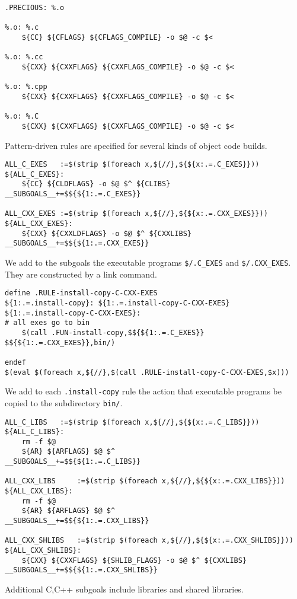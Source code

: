 \documentclass{article}
\begin{document}
\begin{verbatim}
.PRECIOUS: %.o

%.o: %.c
	${CC} ${CFLAGS} ${CFLAGS_COMPILE} -o $@ -c $<

%.o: %.cc
	${CXX} ${CXXFLAGS} ${CXXFLAGS_COMPILE} -o $@ -c $<

%.o: %.cpp
	${CXX} ${CXXFLAGS} ${CXXFLAGS_COMPILE} -o $@ -c $<

%.o: %.C
	${CXX} ${CXXFLAGS} ${CXXFLAGS_COMPILE} -o $@ -c $<
\end{verbatim}
Pattern-driven rules are specified for several kinds of
object code builds.

\begin{verbatim}
ALL_C_EXES   :=$(strip $(foreach x,${//},${${x:.=.C_EXES}}))
${ALL_C_EXES}:
	${CC} ${CLDFLAGS} -o $@ $^ ${CLIBS}
__SUBGOALS__+=$${${1:.=.C_EXES}}

ALL_CXX_EXES :=$(strip $(foreach x,${//},${${x:.=.CXX_EXES}}))
${ALL_CXX_EXES}:
	${CXX} ${CXXLDFLAGS} -o $@ $^ ${CXXLIBS}
__SUBGOALS__+=$${${1:.=.CXX_EXES}}
\end{verbatim}
We add to the subgoals the executable programs \verb+$/.C_EXES+ and
\verb+$/.CXX_EXES+.  They are constructed by a link command.

\begin{verbatim}
define .RULE-install-copy-C-CXX-EXES
${1:.=.install-copy}: ${1:.=.install-copy-C-CXX-EXES}
${1:.=.install-copy-C-CXX-EXES}:
# all exes go to bin
	$(call .FUN-install-copy,$${${1:.=.C_EXES}} $${${1:.=.CXX_EXES}},bin/)

endef
$(eval $(foreach x,${//},$(call .RULE-install-copy-C-CXX-EXES,$x)))
\end{verbatim}
We add to each \verb+.install-copy+ rule the action that executable
programs be copied to the subdirectory \verb+bin/+.

\begin{verbatim}
ALL_C_LIBS   :=$(strip $(foreach x,${//},${${x:.=.C_LIBS}}))
${ALL_C_LIBS}:
	rm -f $@
	${AR} ${ARFLAGS} $@ $^
__SUBGOALS__+=$${${1:.=.C_LIBS}}

ALL_CXX_LIBS     :=$(strip $(foreach x,${//},${${x:.=.CXX_LIBS}}))
${ALL_CXX_LIBS}:
	rm -f $@
	${AR} ${ARFLAGS} $@ $^
__SUBGOALS__+=$${${1:.=.CXX_LIBS}}

ALL_CXX_SHLIBS   :=$(strip $(foreach x,${//},${${x:.=.CXX_SHLIBS}}))
${ALL_CXX_SHLIBS}:
	${CXX} ${CXXFLAGS} ${SHLIB_FLAGS} -o $@ $^ ${CXXLIBS}
__SUBGOALS__+=$${${1:.=.CXX_SHLIBS}}
\end{verbatim}
Additional C,C++ subgoals include libraries and shared libraries.
\end{document}
